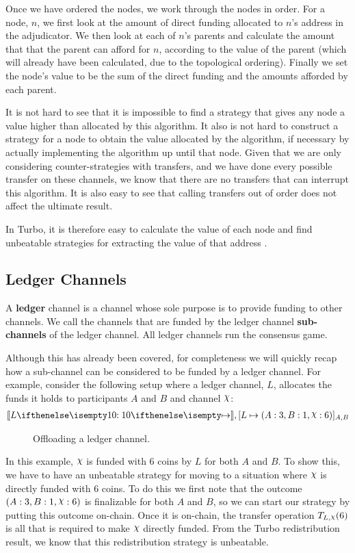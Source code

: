Once we have ordered the nodes, we work through the nodes in order.
For a node, $n$, we first look at the amount of direct funding allocated to $n$'s address in the adjudicator.
We then look at each of $n$'s parents and calculate the amount that that the parent can afford for $n$, according to the value of the parent (which will already have been calculated, due to the topological ordering).
Finally we set the node's value to be the sum of the direct funding and the amounts afforded by each parent.

It is not hard to see that it is impossible to find a strategy that gives any node a value higher than allocated by this algorithm.
It also is not hard to construct a strategy for a node to obtain the value allocated by the algorithm, if necessary by actually implementing the algorithm up until that node.
Given that we are only considering counter-strategies with transfers, and we have done every possible transfer on these channels, we know that there are no transfers that can interrupt this algorithm.
It is also easy to see that calling transfers out of order does not affect the ultimate result.

In Turbo, it is therefore easy to calculate the value of each node and find unbeatable strategies for extracting the value of that address .

\subsection{Ledger Channels}

A \textbf{ledger} channel is a channel whose sole purpose is to provide funding to other channels.
We call the channels that are funded by the ledger channel \textbf{sub-channels} of the ledger channel.
All ledger channels run the consensus game.

Although this has already been covered, for completeness we will quickly recap how a sub-channel can be considered to be funded by a ledger channel.
For example, consider the following setup where a ledger channel, $L$, allocates the funds it holds to participants $A$ and $B$ and channel $\rchi$:
\begin{align}
  \adj{\holds{L}{10}{}}, \finalizable{L}{\alloc{A: 3, B: 1, \rchi: 6}}{A, B}
\end{align}
\begin{figure}[h]\centering
  \makebox[\textwidth][c]{}
  \caption{
    Offloading a ledger channel.
  }\label{fig:ledger-offload}
\end{figure}
In this example, $\rchi$ is funded with 6 coins by $L$ for both $A$ and $B$.
To show this, we have to have an unbeatable strategy for moving to a situation where $\rchi$ is directly funded with 6 coins.
To do this we first note that the outcome $\alloc{A: 3, B: 1, \rchi: 6}$ is finalizable for both $A$ and $B$, so we can start our strategy by putting this outcome on-chain.
Once it is on-chain, the transfer operation $\transfer{L}{\rchi}{6}$ is all that is required to make $\rchi$ directly funded.
From the Turbo redistribution result, we know that this redistribution strategy is unbeatable.

